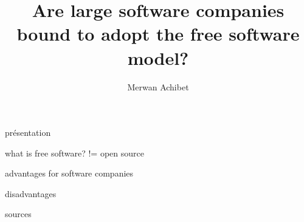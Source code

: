 \documentclass{beamer}
\title{Are large software companies bound to adopt the free software
  model?}
\author{Merwan Achibet}
\begin{document}
présentation
\maketitle

what is free software?
!= open source

advantages for software companies

disadvantages

sources
\end{document}
